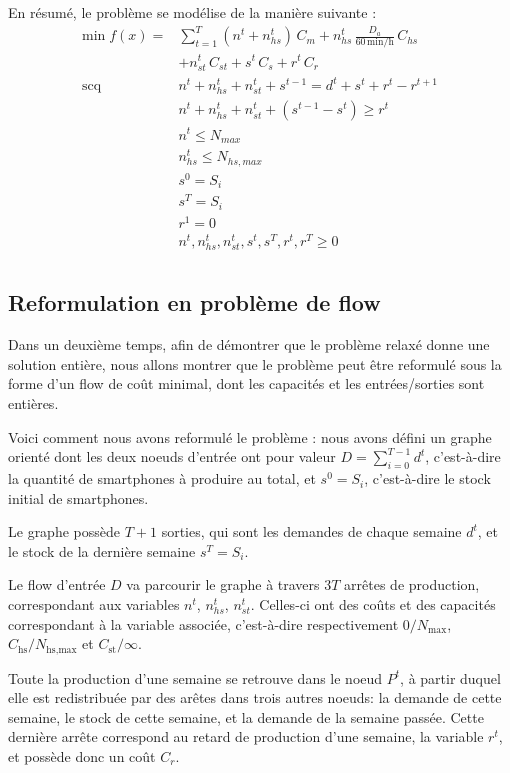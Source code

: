 En résumé, le problème se modélise de la manière suivante :
\begin{align*}
    \mathrm{min}\;f(x) =& \sum_{t=1}^{T}
    (n^t + n_{hs}^t)\,C_m 
    + n_{hs}^t\,\frac{D_a}{60 \,\mathrm{min/h}}\,C_{hs} \\
    &+ n_{st}^t\,C_{st}
    + s^t\,C_s
    + r^t\,C_r \\[0.5em]
%
    \mathrm{scq}\;\phantom{f(x) =}
    & n^t + n_{hs}^t + n_{st}^t + s^{t-1} = d^t + s^t + r^t - r^{t+1} \\
    & n^t + n_{hs}^t + n_{st}^t + (s^{t-1} - s^t) \geq r^t \\
    & n^t \leq N_{max} \\
    & n_{hs}^t \leq N_{hs,max} \\
    & s^0 = S_i \\
    & s^T = S_i \\
    & r^1 = 0 \\
    & n^t, n_{hs}^t, n_{st}^t, s^t, s^T, r^t, r^T \geq 0 \\
\end{align*}

\subsection{Reformulation en problème de flow}

Dans un deuxième temps, afin de démontrer que le problème relaxé donne une solution entière, nous allons montrer que le problème peut être reformulé sous la forme d'un flow de coût minimal, dont les capacités et les entrées/sorties sont entières.

Voici comment nous avons reformulé le problème : nous avons défini un graphe orienté dont les deux noeuds d'entrée ont pour valeur $D=\sum_{i=0}^{T-1} d^t$, c'est-à-dire la quantité de smartphones à produire au total, et $s^0 = S_i$, c'est-à-dire le stock initial de smartphones.

Le graphe possède $T+1$ sorties, qui sont les demandes de chaque semaine $d^t$, et le stock de la dernière semaine $s^T = S_i$.

Le flow d'entrée $D$ va parcourir le graphe à travers $3T$ arrêtes de \og{}production\fg{}, correspondant aux variables $n^t$, $n_{hs}^t$, $n_{st}^t$. Celles-ci ont des coûts et des capacités correspondant à la variable associée, c'est-à-dire respectivement $0/N_\text{max}$, $C_\text{hs}/N_\text{hs,max}$ et $C_\text{st}/\infty$.

Toute la production d'une semaine se retrouve dans le noeud $P^t$, à partir duquel elle est redistribuée par des arêtes dans trois autres noeuds: la demande de cette semaine, le stock de cette semaine, et la demande de la semaine passée. Cette dernière arrête correspond au retard de production d'une semaine, la variable $r^t$, et possède donc un coût $C_r$.

